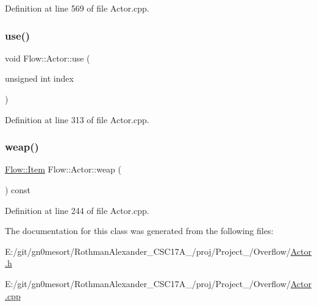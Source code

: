 Definition at line 569 of file Actor.\+cpp.

\hypertarget{class_flow_1_1_actor_af13b4677ccd567310e86791b2a68be5d}{}\label{class_flow_1_1_actor_af13b4677ccd567310e86791b2a68be5d} 
\subsubsection{\texorpdfstring{use()}{use()}}
{\footnotesize\ttfamily void Flow\+::\+Actor\+::use (\begin{DoxyParamCaption}\item[{unsigned int}]{index }\end{DoxyParamCaption})}



Definition at line 313 of file Actor.\+cpp.

\hypertarget{class_flow_1_1_actor_ac3a62be0b16ee5c462dfb573b45d16b0}{}\label{class_flow_1_1_actor_ac3a62be0b16ee5c462dfb573b45d16b0} 
\subsubsection{\texorpdfstring{weap()}{weap()}}
{\footnotesize\ttfamily \hyperlink{class_flow_1_1_item}{Flow\+::\+Item} Flow\+::\+Actor\+::weap (\begin{DoxyParamCaption}{ }\end{DoxyParamCaption}) const}



Definition at line 244 of file Actor.\+cpp.



The documentation for this class was generated from the following files\+:\begin{DoxyCompactItemize}
\item 
E\+:/git/gn0mesort/\+Rothman\+Alexander\+\_\+\+C\+S\+C17\+A\+\_/proj/\+Project\+\_/\+Overflow/\hyperlink{_actor_8h}{Actor.\+h}\item 
E\+:/git/gn0mesort/\+Rothman\+Alexander\+\_\+\+C\+S\+C17\+A\+\_/proj/\+Project\+\_/\+Overflow/\hyperlink{_actor_8cpp}{Actor.\+cpp}\end{DoxyCompactItemize}
